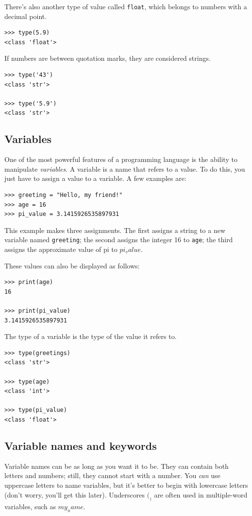 There's also another type of value called \texttt{float}, which belongs to numbers with a decimal point.
\begin{verbatim}
>>> type(5.9)
<class 'float'>
\end{verbatim}

If numbers are between quotation marks, they are considered strings.
\begin{verbatim}
>>> type('43')
<class 'str'>
    
>>> type('5.9')
<class 'str'>  
\end{verbatim}

\subsection{Variables}
One of the most powerful features of a programming language is the ability to manipulate \textit{variables}. A variable is a name that refers to a value. To do this, you just have to assign a value to a variable. A few examples are:
\begin{verbatim}
>>> greeting = "Hello, my friend!"
>>> age = 16
>>> pi_value = 3.1415926535897931

\end{verbatim}
This example makes three assignments. The first assigns a string to a new variable named \texttt{greeting}; the second assigns the integer 16 to \texttt{age}; the third assigns the approximate value of pi to $pi_value$.

These values can also be displayed as follows:

\begin{verbatim}
>>> print(age)
16
    
>>> print(pi_value)
3.1415926535897931
\end{verbatim}

The type of a variable is the type of the value it refers to.

\begin{verbatim}
>>> type(greetings)
<class 'str'>
    
>>> type(age)
<class 'int'>
    
>>> type(pi_value)
<class 'float'>
\end{verbatim}

\subsection{Variable names and keywords}
Variable names can be as long as you want it to be. They can contain both letters and numbers; still, they cannot start with a number. You \textit{can} use uppercase letters to name variables, but it's better to begin with lowercase letters (don't worry, you'll get this later). 
Underscores $(_)$ are often used in multiple-word variables, such as $my_name$.

